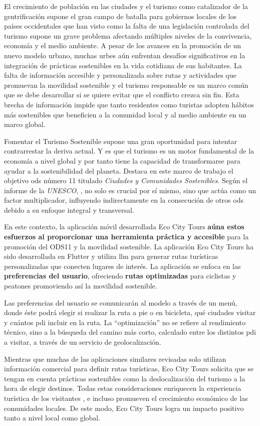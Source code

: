 
El crecimiento de población en las ciudades \cite{nieuwenhuijsen_urban_2020} y el turismo como catalizador de la gentrificación supone el gran campo de batalla para gobiernos locales de los países occidentales que han visto como la falta de una legislación controlada del turismo supone un grave problema afectando múltiples niveles de la convivencia, economía y el medio ambiente. A pesar de los avances en la promoción de un nuevo modelo urbano, muchas urbes aún enfrentan desafíos significativos en la integración de prácticas sostenibles en la vida cotidiana de sus habitantes. La falta de información accesible y personalizada sobre rutas y actividades que promuevan la movilidad sostenible y el turismo responsable es un marco común que se debe desarrollar si se quiere evitar que el conflicto crezca sin fin. Esta brecha de información impide que tanto residentes como turistas adopten hábitos más sostenibles que beneficien a la comunidad local y al medio ambiente en un marco global.

Fomentar el Turismo Sostenible supone una gran oportunidad para intentar contrarrestar la deriva actual. Y es que el turismo es un motor fundamental de la economía a nivel global y por tanto tiene la capacidad de transformarse para ayudar a la sostenibilidad del planeta.  Destaca en este marco de trabajo el  objetivo \acrshort{ods} número 11 titulado \textit{Ciudades y Comunidades Sostenibles}. Según el informe de la \textit{UNESCO}, \cite{ionescu_progress_2024}, no solo es crucial por sí mismo, sino que actúa como un factor multiplicador, influyendo indirectamente en la consecución de otros \acrshort{ods} debido a su enfoque integral y transversal.

En este contexto, la aplicación móvil desarrollada Eco City Tours \textbf{aúna estos esfuerzos al proporcionar una herramienta práctica y accesible} para la promoción del ODS11 y la movilidad sostenible. La aplicación Eco City Tours ha sido desarrollada en Flutter y utiliza \acrfull{llm} para generar rutas turísticas personalizadas que conecten lugares de interés. La aplicación se enfoca en las \textbf{preferencias del usuario}, ofreciendo \textbf{rutas optimizadas} para ciclistas y peatones promoviendo así la movilidad sostenible.

Las preferencias del usuario se comunicarán al modelo a través de un menú, donde éste podrá elegir si realizar la ruta a pie o en bicicleta, qué ciudades visitar y cuántos \acrlong{pdi} incluir en la ruta. La ``optimización'' no se refiere al rendimiento técnico, sino a la búsqueda del camino más corto, calculado entre los distintos \acrshort{pdi} a visitar, a través de un servicio de geolocalización.

Mientras que muchas de las aplicaciones similares revisadas solo utilizan información comercial para definir rutas turísticas, Eco City Tours solicita que se tengan en cuenta prácticas sostenibles como la deslocalización del turismo a la hora de elegir destinos. Todas estas consideraciones enriquecen la experiencia turística de los visitantes \cite{mitas_tell_2023}, e incluso promueven el crecimiento económico de las comunidades locales. De este modo, Eco City Tours logra un impacto positivo tanto a nivel local como global.